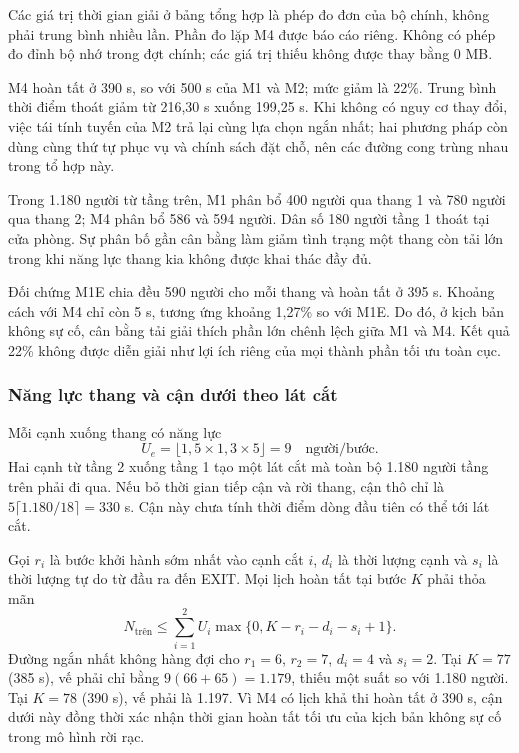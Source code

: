 Các giá trị thời gian giải ở bảng tổng hợp là phép đo đơn của bộ chính, không phải trung bình nhiều lần. Phần đo lặp M4 được báo cáo riêng. Không có phép đo đỉnh bộ nhớ trong đợt chính; các giá trị thiếu không được thay bằng 0 MB.

M4 hoàn tất ở 390 s, so với 500 s của M1 và M2; mức giảm là 22\%. Trung bình thời điểm thoát giảm từ 216,30 s xuống 199,25 s. Khi không có nguy cơ thay đổi, việc tái tính tuyến của M2 trả lại cùng lựa chọn ngắn nhất; hai phương pháp còn dùng cùng thứ tự phục vụ và chính sách đặt chỗ, nên các đường cong trùng nhau trong tổ hợp này.

Trong 1.180 người từ tầng trên, M1 phân bổ 400 người qua thang 1 và 780 người qua thang 2; M4 phân bổ 586 và 594 người. Dân số 180 người tầng 1 thoát tại cửa phòng. Sự phân bố gần cân bằng làm giảm tình trạng một thang còn tải lớn trong khi năng lực thang kia không được khai thác đầy đủ.

Đối chứng M1E chia đều 590 người cho mỗi thang và hoàn tất ở 395 s. Khoảng cách với M4 chỉ còn 5 s, tương ứng khoảng 1,27\% so với M1E. Do đó, ở kịch bản không sự cố, cân bằng tải giải thích phần lớn chênh lệch giữa M1 và M4. Kết quả 22\% không được diễn giải như lợi ích riêng của mọi thành phần tối ưu toàn cục.

\subsubsection{Năng lực thang và cận dưới theo lát cắt}
Mỗi cạnh xuống thang có năng lực
\begin{equation}U_e=\lfloor1{,}5\times1{,}3\times5\rfloor=9\quad\text{người/bước}.\end{equation}
Hai cạnh từ tầng 2 xuống tầng 1 tạo một lát cắt mà toàn bộ 1.180 người tầng trên phải đi qua. Nếu bỏ thời gian tiếp cận và rời thang, cận thô chỉ là $5\lceil1.180/18\rceil=330$ s. Cận này chưa tính thời điểm dòng đầu tiên có thể tới lát cắt.

Gọi $r_i$ là bước khởi hành sớm nhất vào cạnh cắt $i$, $d_i$ là thời lượng cạnh và $s_i$ là thời lượng tự do từ đầu ra đến EXIT. Mọi lịch hoàn tất tại bước $K$ phải thỏa mãn
\begin{equation}N_{\mathrm{trên}}\le\sum_{i=1}^{2}U_i\max\{0,K-r_i-d_i-s_i+1\}.\label{eq:cutbound}\end{equation}
Đường ngắn nhất không hàng đợi cho $r_1=6$, $r_2=7$, $d_i=4$ và $s_i=2$. Tại $K=77$ (385 s), vế phải chỉ bằng $9(66+65)=1.179$, thiếu một suất so với 1.180 người. Tại $K=78$ (390 s), vế phải là 1.197. Vì M4 có lịch khả thi hoàn tất ở 390 s, cận dưới này đồng thời xác nhận thời gian hoàn tất tối ưu của kịch bản không sự cố trong mô hình rời rạc.

